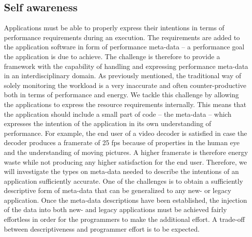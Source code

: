 \documentclass{article}
\begin{document}
\subsection{Self awareness}
\label{sec:self}
Applications must be able to properly express their intentions in terms of performance requirements during an execution. 
The requirements are added to the application software in form of performance meta-data -- a performance goal the application is due to achieve. 
The challenge is therefore to provide a framework with the capability of handling and expressing performance meta-data in an interdisciplinary domain.
As previously mentioned, the traditional way of solely monitoring the workload is a very inaccurate and often counter-productive both in terms of performance and energy.
We tackle this challenge by allowing the applications to express the resource requirements internally.
This means that the application should include a small part of code -- the meta-data -- which expresses the intention of the application in its own understanding of performance.
For example, the end user of a video decoder is satisfied in case the decoder produces a framerate of 25 fps because of properties in the human eye and the understanding of moving pictures. 
A higher framerate is therefore energy waste while not producing any higher satisfaction for the end user.
Therefore, we will investigate the types on meta-data needed to describe the intentions of an application sufficiently accurate.
One of the challenges is to obtain a sufficiently descriptive form of meta-data that can be generalized to any new- or legacy application.
Once the meta-data descriptions have been established, the injection of the data into both new- and legacy applications must be achieved fairly effortless in order for the programmers to make the additional effort.
A trade-off between descriptiveness and programmer effort is to be expected.
\end{document}
